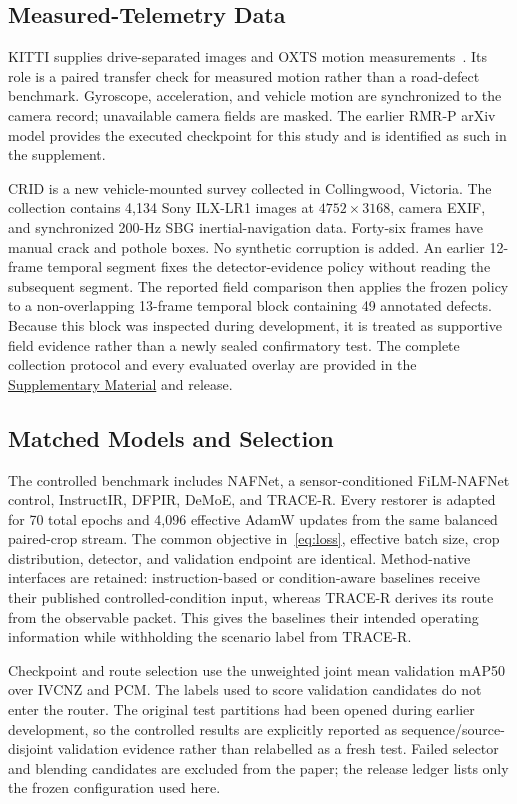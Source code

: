 \documentclass[journal]{IEEEtran}
\newcommand{\suppmat}{\href{run:supplementary.pdf}{Supplementary Material}\xspace}
\begin{document}
\subsection{Measured-Telemetry Data}
KITTI supplies drive-separated images and OXTS motion measurements~\cite{geiger2012kitti}. Its role is a paired transfer check for measured motion rather than a road-defect benchmark. Gyroscope, acceleration, and vehicle motion are synchronized to the camera record; unavailable camera fields are masked. The earlier RMR-P arXiv model provides the executed checkpoint for this study and is identified as such in the supplement.

CRID is a new vehicle-mounted survey collected in Collingwood, Victoria. The collection contains 4,134 Sony ILX-LR1 images at $4752\times3168$, camera EXIF, and synchronized 200-Hz SBG inertial-navigation data. Forty-six frames have manual crack and pothole boxes. No synthetic corruption is added. An earlier 12-frame temporal segment fixes the detector-evidence policy without reading the subsequent segment. The reported field comparison then applies the frozen policy to a non-overlapping 13-frame temporal block containing 49 annotated defects. Because this block was inspected during development, it is treated as supportive field evidence rather than a newly sealed confirmatory test. The complete collection protocol and every evaluated overlay are provided in the \suppmat and release.

\subsection{Matched Models and Selection}
The controlled benchmark includes NAFNet, a sensor-conditioned FiLM-NAFNet control, InstructIR, DFPIR, DeMoE, and TRACE-R. Every restorer is adapted for 70 total epochs and 4,096 effective AdamW updates from the same balanced paired-crop stream. The common objective in~\eqref{eq:loss}, effective batch size, crop distribution, detector, and validation endpoint are identical. Method-native interfaces are retained: instruction-based or condition-aware baselines receive their published controlled-condition input, whereas TRACE-R derives its route from the observable packet. This gives the baselines their intended operating information while withholding the scenario label from TRACE-R.

Checkpoint and route selection use the unweighted joint mean validation mAP50 over IVCNZ and PCM. The labels used to score validation candidates do not enter the router. The original test partitions had been opened during earlier development, so the controlled results are explicitly reported as sequence/source-disjoint validation evidence rather than relabelled as a fresh test. Failed selector and blending candidates are excluded from the paper; the release ledger lists only the frozen configuration used here.
\end{document}
